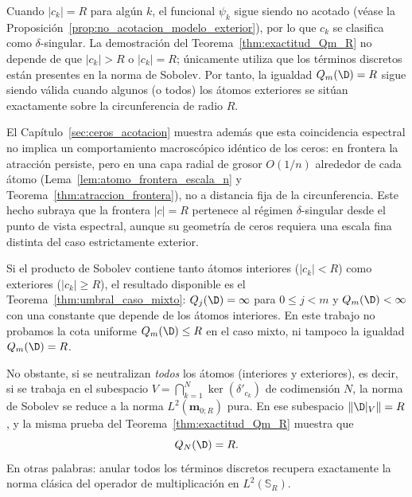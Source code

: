\begin{rmk}[El caso de la frontera $|c|=R$]\label{rem:frontera_Qm}
	Cuando $|c_k|=R$ para algún $k$, el funcional $\psi_k$ sigue siendo no acotado (véase la Proposición~\ref{prop:no_acotacion_modelo_exterior}), por lo que $c_k$ se clasifica como $\delta$-singular. La demostración del Teorema~\ref{thm:exactitud_Qm_R} no depende de que $|c_k|>R$ o $|c_k|=R$; únicamente utiliza que los términos discretos están presentes en la norma de Sobolev. Por tanto, la igualdad $Q_m(\D)=R$ sigue siendo válida cuando algunos (o todos) los átomos exteriores se sitúan exactamente sobre la circunferencia de radio $R$.

	El Capítulo~\ref{sec:ceros_acotacion} muestra además que esta coincidencia espectral no implica un comportamiento macroscópico idéntico de los ceros: en frontera la atracción persiste, pero en una capa radial de grosor $O(1/n)$ alrededor de cada átomo (Lema~\ref{lem:atomo_frontera_escala_n} y Teorema~\ref{thm:atraccion_frontera}), no a distancia fija de la circunferencia. Este hecho subraya que la frontera $|c|=R$ pertenece al régimen $\delta$-singular desde el punto de vista espectral, aunque su geometría de ceros requiera una escala fina distinta del caso estrictamente exterior.
\end{rmk}

\begin{rmk}
	Si el producto de Sobolev contiene tanto átomos interiores ($|c_k|<R$) como exteriores ($|c_k|\ge R$), el resultado disponible es el Teorema~\ref{thm:umbral_caso_mixto}: $Q_j(\D)=\infty$ para $0\le j<m$ y $Q_m(\D)<\infty$ con una constante que depende de los átomos interiores. En este trabajo no probamos la cota uniforme $Q_m(\D)\le R$ en el caso mixto, ni tampoco la igualdad $Q_m(\D)=R$.

	No obstante, si se neutralizan \emph{todos} los átomos (interiores y exteriores), es decir, si se trabaja en el subespacio $V=\bigcap_{k=1}^N\ker(\delta'_{c_k})$ de codimensión $N$, la norma de Sobolev se reduce a la norma $L^2(\mathbf m_{0;R})$ pura. En ese subespacio $\|\D|_V\|=R$, y la misma prueba del Teorema~\ref{thm:exactitud_Qm_R} muestra que
	\[
		Q_N(\D)=R.
	\]
	En otras palabras: anular todos los términos discretos recupera exactamente la norma clásica del operador de multiplicación en $L^2(\mathbb S_R)$.
\end{rmk}

